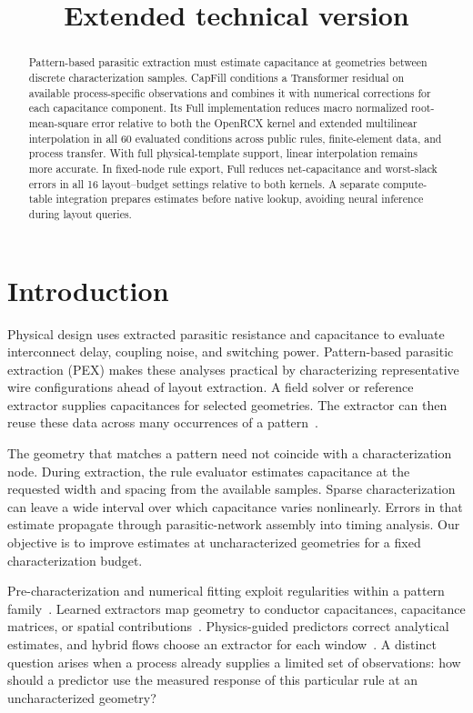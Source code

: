 \documentclass[conference,9pt,letterpaper]{IEEEtran}
\title{\papertitle\ifdefined\CapFillExtended\\{\large Extended technical version}\fi}
\begin{document}
\maketitle
\begingroup
\renewcommand{\thefootnote}{}
\endgroup
\begin{abstract}
Pattern-based parasitic extraction must estimate capacitance at geometries between discrete characterization samples. CapFill conditions a Transformer residual on available process-specific observations and combines it with numerical corrections for each capacitance component. Its Full implementation reduces macro normalized root-mean-square error relative to both the OpenRCX kernel and extended multilinear interpolation in all 60 evaluated conditions across public rules, finite-element data, and process transfer. With full physical-template support, linear interpolation remains more accurate. In fixed-node rule export, Full reduces net-capacitance and worst-slack errors in all 16 layout--budget settings relative to both kernels. A separate compute-table integration prepares estimates before native lookup, avoiding neural inference during layout queries.
\end{abstract}
\section{Introduction}
Physical design uses extracted parasitic resistance and capacitance to evaluate interconnect delay, coupling noise, and switching power. Pattern-based parasitic extraction (PEX) makes these analyses practical by characterizing representative wire configurations ahead of layout extraction. A field solver or reference extractor supplies capacitances for selected geometries. The extractor can then reuse these data across many occurrences of a pattern~\cite{tsai,openrcx}.

The geometry that matches a pattern need not coincide with a characterization node. During extraction, the rule evaluator estimates capacitance at the requested width and spacing from the available samples. Sparse characterization can leave a wide interval over which capacitance varies nonlinearly. Errors in that estimate propagate through parasitic-network assembly into timing analysis. Our objective is to improve estimates at uncharacterized geometries for a fixed characterization budget.

Pre-characterization and numerical fitting exploit regularities within a pattern family~\cite{li2020autoprechar,orcx_runtime}. Learned extractors map geometry to conductor capacitances, capacitance matrices, or spatial contributions~\cite{yang2023cnncap,zhou2026rmlpcap,attentioncap,flash}. Physics-guided predictors correct analytical estimates, and hybrid flows choose an extractor for each window~\cite{rescap,hybrid}. A distinct question arises when a process already supplies a limited set of observations: how should a predictor use the measured response of this particular rule at an uncharacterized geometry?
\end{document}
